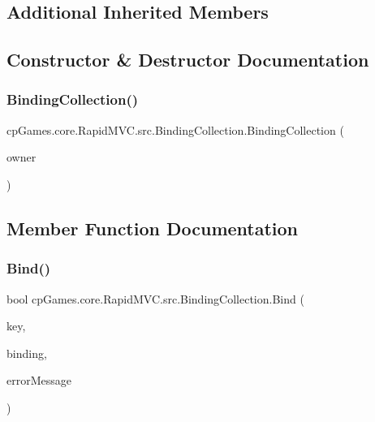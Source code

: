 \subsection*{Additional Inherited Members}


\subsection{Constructor \& Destructor Documentation}
\mbox{\label{classcp_games_1_1core_1_1_rapid_m_v_c_1_1src_1_1_binding_collection_afa9558a65905fb3094e0d7f68d8a689e}} 
\subsubsection{\texorpdfstring{BindingCollection()}{BindingCollection()}}
{\footnotesize\ttfamily cp\+Games.\+core.\+Rapid\+M\+V\+C.\+src.\+Binding\+Collection.\+Binding\+Collection (\begin{DoxyParamCaption}\item[{\mbox{\hyperlink{interfacecp_games_1_1core_1_1_rapid_m_v_c_1_1_i_context}{I\+Context}}}]{owner }\end{DoxyParamCaption})}



\subsection{Member Function Documentation}
\mbox{\label{classcp_games_1_1core_1_1_rapid_m_v_c_1_1src_1_1_binding_collection_a766bda0a58edf276bb1eaf3185fa6317}} 
\subsubsection{\texorpdfstring{Bind()}{Bind()}}
{\footnotesize\ttfamily bool cp\+Games.\+core.\+Rapid\+M\+V\+C.\+src.\+Binding\+Collection.\+Bind (\begin{DoxyParamCaption}\item[{\mbox{\hyperlink{interfacecp_games_1_1core_1_1_rapid_m_v_c_1_1_i_binding_key}{I\+Binding\+Key}}}]{key,  }\item[{out \mbox{\hyperlink{interfacecp_games_1_1core_1_1_rapid_m_v_c_1_1_i_binding}{I\+Binding}}}]{binding,  }\item[{out string}]{error\+Message }\end{DoxyParamCaption})}




